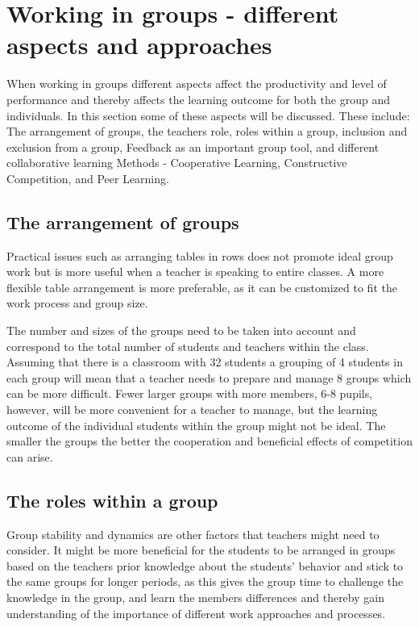 \section{Working in groups - different aspects and approaches} %

When working in groups different aspects affect the productivity and level of performance \cite{GodKlassekultur} and thereby affects the learning outcome for both the group and individuals. In this section some of these aspects will be discussed. These include: The arrangement of groups, the teachers role, roles within a group, inclusion and exclusion from a group, Feedback as an important group tool, and different collaborative learning Methods - Cooperative Learning, Constructive Competition, and Peer Learning.

\subsection{The arrangement of groups}\label{GroupArrangement}
Practical issues such as arranging tables in rows does not promote ideal group work but is more useful when a teacher is speaking to entire classes\cite{collaborationSocialPedagogy}. A more flexible table arrangement is more preferable, as it can be customized to fit the work process and group size\cite{collaborationSocialPedagogy}. 

The number and sizes of the groups need to be taken into account and correspond to the total number of students and teachers within the class. Assuming that there is a classroom with 32 students a grouping of 4 students in each group will mean that a teacher needs to prepare and manage 8 groups which can be more difficult. Fewer larger groups with more members, 6-8 pupils, however, will be more convenient for a teacher to manage, but the learning outcome of the individual students within the group might not be ideal\cite{collaborationSocialPedagogy}. The smaller the groups the better the cooperation and beneficial effects of competition can arise\cite{collaborationCompetitionGames}.

\subsection{The roles within a group}
Group stability and dynamics are other factors that teachers might need to consider. It might be more beneficial for the students to be arranged in groups based on the teachers prior knowledge about the students' behavior and stick to the same groups for longer periods\cite{collaborationSocialPedagogy}, as this gives the group time to challenge the knowledge in the group, and learn the members differences and thereby gain understanding of the importance of different work approaches and processes\cite{laeringIPraksis}.


